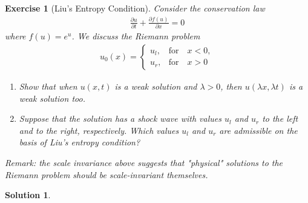 \documentclass[10pt,letterpaper]{article}
\theoremstyle{break}
\newtheorem{exercise}{Exercise}
\newtheorem{solution}{Solution}
\begin{document}
\begin{exercise}[Liu's Entropy Condition]
    Consider the conservation law 
    \begin{align}
    	\frac{\partial u}{\partial t}
    	+
    	\frac{\partial f(u)}{\partial x}
    	= 0 
    \end{align}
    where $f(u) = e^u$. We discuss the Riemann problem
    \begin{align}
    	u_0(x) = 
    	\left\{
    	\begin{array}{cl}
    	u_l, & \text{for} \quad x<0,\\
    	u_r, &\text{for} \quad x > 0
    	\end{array}
    	\right.
    \end{align}
    \begin{enumerate}
        \item Show that when $u(x,t)$ is a weak solution and $\lambda > 0$, then $u(\lambda x, \lambda t)$ is a weak solution too.
        \item Suppose that the solution has a shock wave with values $u_l$ and $u_r$ to the left and to the right, respectively.
        Which values $u_l$ and $u_r$ are admissible on the basis of Liu's entropy condition?
    \end{enumerate}
    \textit{Remark: the scale invariance above suggests that "physical" solutions to the Riemann problem should be scale-invariant themselves.}
\end{exercise}

\begin{solution}
    
\end{solution}
\end{document}

